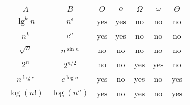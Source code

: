 \documentclass{article}
\begin{document}
\begin{tabular}{c|c|c|c|c|c|c|}
$A$ & $B$ & $O$ & $o$ & $\Omega$ & $\omega$ & $\Theta$ \\ \hline
$\lg^k n$ & $n^\epsilon$ & yes & yes & no & no & no \\ \hline
$n^k$ & $c^n$ & yes & yes & no & no & no \\ \hline 
$\sqrt{n}$ & $n^{\sin n}$ & no & no & no & no & no \\ \hline
$2^n$ & $2^{n/2}$ & no & no & yes & yes & no \\ \hline
$n^{\log c}$ & $c^{\log n}$ & yes & no & yes & no & yes \\ \hline
$\log(n!)$ & $\log(n^n)$ & yes & no & yes & no & yes \\ \hline
\end{tabular} \\
\end{document}
